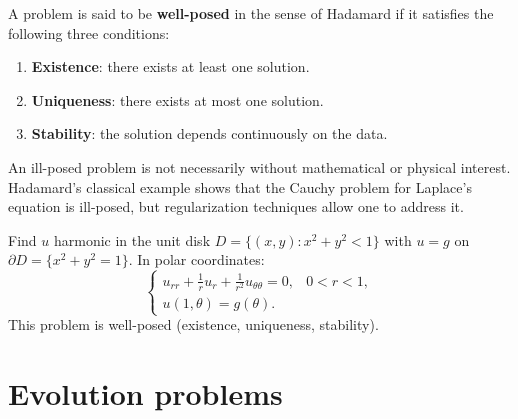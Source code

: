 \begin{center}
\end{center}

\begin{definition}
A problem is said to be \textbf{well-posed} in the sense of Hadamard if it
satisfies the following three conditions:
\begin{enumerate}
    \item \textbf{Existence}: there exists at least one solution.
    \item \textbf{Uniqueness}: there exists at most one solution.
    \item \textbf{Stability}: the solution depends continuously on the data.
\end{enumerate}
\end{definition}

\begin{warning}[title=\textbf{Importance of well-posedness}]
An ill-posed problem is not necessarily without mathematical or physical
interest. Hadamard's classical example shows that the Cauchy problem for
Laplace's equation is ill-posed, but regularization techniques allow one
to address it.
\end{warning}

\begin{example}
Find $u$ harmonic in the unit disk $D = \{(x,y) : x^2+y^2 < 1\}$
with $u = g$ on $\partial D = \{x^2+y^2=1\}$. In polar coordinates:
\[
    \begin{cases}
        u_{rr} + \frac{1}{r}u_r + \frac{1}{r^2}u_{\theta\theta} = 0,
        & 0 < r < 1,\\
        u(1,\theta) = g(\theta).
    \end{cases}
\]
This problem is well-posed (existence, uniqueness, stability).
\end{example}

\section{Evolution problems}

